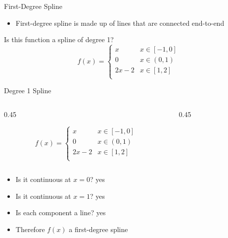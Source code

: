 \documentclass[10pt]{beamer}
\begin{document}
\begin{frame}{First-Degree Spline}

\begin{itemize}
    \item First-degree spline is made up of lines that are connected end-to-end
\end{itemize}
\begin{example}
Is this function a spline of degree 1?
\begin{equation*}
  f(x) = \begin{cases}
  x & x \in [-1,0]\\
  0 & x \in (0,1)\\
  2x-2 & x \in [1,2]\\
\end{cases}
\end{equation*}
\end{example}
\end{frame}

\begin{frame}{Degree 1 Spline}
\begin{columns}
\begin{column}{0.45\textwidth}
\begin{example}
\begin{equation*}
  f(x) = \begin{cases}
  x & x \in [-1,0]\\
  0 & x \in (0,1)\\
  2x-2 & x \in [1,2]\\
\end{cases}
\end{equation*}
\end{example}
\end{column}
\begin{column}{0.45\textwidth}
\begin{center}
\end{center}
\end{column}
\end{columns}
\begin{itemize}
    \item Is it continuous at $x=0$? yes 
    \item Is it continuous at $x=1$? yes 
    \item Is each component a line? yes 
    \item Therefore $f(x)$ a first-degree spline
\end{itemize}
\end{frame}
\end{document}
